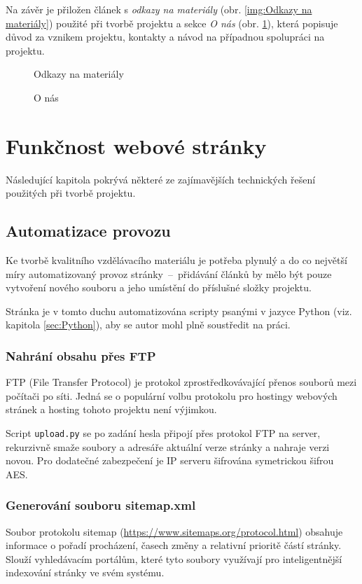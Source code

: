 \documentclass[a4paper, 12pt]{article}
\begin{document}
  Na závěr je přiložen článek s \emph{odkazy na materiály} (obr. \ref{img:Odkazy na materiály}) použité při tvorbě projektu a sekce \emph{O nás} (obr. \ref{img:O nás}), která popisuje důvod za vznikem projektu, kontakty a návod na případnou spolupráci na projektu.

  \begin{figure}[H]
      \caption{Odkazy na materiály} \label{img:Odkazy na materiály}
    \endminipage\hfill
      \caption{O nás} \label{img:O nás}
    \endminipage
  \end{figure}


  \section{Funkčnost webové stránky}
  Následující kapitola pokrývá některé ze zajímavějších technických řešení použitých při tvorbě projektu.


  \subsection{Automatizace provozu} \label{sec:Automatizace provozu}
  Ke tvorbě kvalitního vzdělávacího materiálu je potřeba plynulý a do co největší míry automatizovaný provoz stránky~--~přidávání článků by mělo být pouze vytvoření nového souboru a jeho umístění do příslušné složky projektu.

  Stránka je v tomto duchu automatizována scripty psanými v jazyce Python (viz. kapitola \ref{sec:Python}), aby se autor mohl plně soustředit na práci.


  \subsubsection{Nahrání obsahu přes FTP}
  FTP (File Transfer Protocol) je protokol zprostředkovávající přenos souborů mezi počítači po síti. Jedná se o populární volbu protokolu pro hostingy webových stránek a hosting tohoto projektu není výjimkou.

  Script \texttt{upload.py} se po zadání hesla připojí přes protokol FTP na server, rekurzivně smaže soubory a adresáře aktuální verze stránky a nahraje verzi novou. Pro dodatečné zabezpečení je IP serveru šifrována symetrickou šifrou AES.


  \subsubsection{Generování souboru sitemap.xml}
  Soubor protokolu sitemap (\url{https://www.sitemaps.org/protocol.html}) obsahuje informace o pořadí procházení, časech změny a relativní prioritě částí stránky. Slouží vyhledávacím portálům, které tyto soubory využívají pro inteligentnější indexování stránky ve svém systému.
\end{document}
